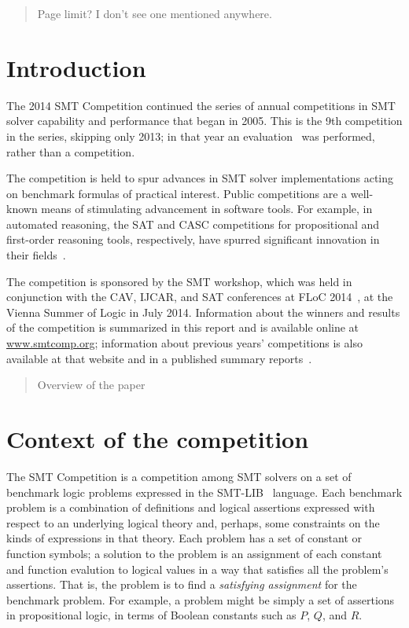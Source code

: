 \documentclass[twosize,11pt]{article}
\newcommand{\comment}[2]{\begin{quote}\sc #1\marginpar{\textcolor{red}{$\ast^{\mbox{#2}}$}}\end{quote}}
\newcommand{\tjark}[1]{\comment{#1}{TW}}
\newcommand{\davidd}[1]{\comment{#1}{DD}}
\newcommand{\davidc}[1]{\comment{#1}{DC}}
\begin{document}
	\davidc{Page limit? I don't see one mentioned anywhere.}
	
	
\section{Introduction}
\label{sec:intro}

The 2014 SMT Competition continued the series of annual competitions in SMT solver capability and performance that began in 2005. This is the 9th competition in the series, skipping only 2013; in that year an evaluation~\cite{it:2014-017} was performed, rather than a competition.

The competition is held to spur advances in
SMT solver implementations acting on benchmark formulas of practical interest. Public competitions are
a well-known means of stimulating advancement in software tools. For example, in automated
reasoning, the SAT and CASC competitions for propositional and first-order reasoning tools, respectively,
have spurred significant innovation in their fields~\cite{leberre+03,PSS02}.

The competition is sponsored by the SMT workshop, which was held in conjunction with the
CAV, IJCAR, and SAT conferences at FLoC 2014~\cite{FLoC2014}, at the Vienna Summer of Logic\cite{VSL} in July 2014.
Information about the winners
and results of the competition is summarized in this report and is available online at \url{www.smtcomp.org}; information
about previous years' competitions is also available at that website and in a published summary reports~\cite{springerlink:10.1007/s10817-012-9246-5,DBLP:conf/cade/CokGBD12,it:2014-017}.%

\davidd{Overview of the paper}

\section{Context of the competition}
\label{sec:context}

The SMT Competition is a competition among SMT solvers on a set of benchmark logic problems expressed in the SMT-LIB~\cite{BarST-RR-10} language. Each benchmark problem is a combination of definitions and logical assertions expressed with respect to an underlying logical theory and, perhaps, some constraints on the kinds of expressions in that theory. Each problem has a set of constant or function symbols; a solution to the problem is an assignment of each constant and function evalution to logical values in a way that satisfies all the problem's assertions. That is, the problem is to find a \textit{satisfying assignment} for the benchmark problem. For example, a problem might be simply a set of assertions in 
propositional logic, in terms of Boolean constants such as $P$, $Q$, and $R$.
\end{document}
